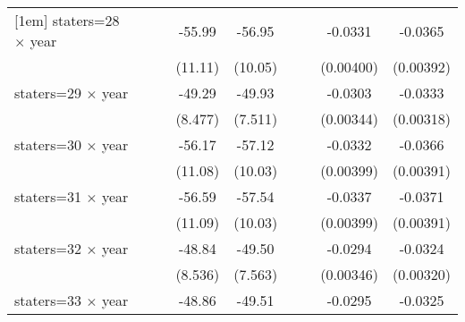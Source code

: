 {\begin{longtable}{l*{8}{c}}
[1em]
staters=28 $\times$ year&                     &                     &      -55.99\sym{***}&      -56.95\sym{***}&                     &                     &     -0.0331\sym{***}&     -0.0365\sym{***}\\
                    &                     &                     &     (11.11)         &     (10.05)         &                     &                     &   (0.00400)         &   (0.00392)         \\
[1em]
staters=29 $\times$ year&                     &                     &      -49.29\sym{***}&      -49.93\sym{***}&                     &                     &     -0.0303\sym{***}&     -0.0333\sym{***}\\
                    &                     &                     &     (8.477)         &     (7.511)         &                     &                     &   (0.00344)         &   (0.00318)         \\
[1em]
staters=30 $\times$ year&                     &                     &      -56.17\sym{***}&      -57.12\sym{***}&                     &                     &     -0.0332\sym{***}&     -0.0366\sym{***}\\
                    &                     &                     &     (11.08)         &     (10.03)         &                     &                     &   (0.00399)         &   (0.00391)         \\
[1em]
staters=31 $\times$ year&                     &                     &      -56.59\sym{***}&      -57.54\sym{***}&                     &                     &     -0.0337\sym{***}&     -0.0371\sym{***}\\
                    &                     &                     &     (11.09)         &     (10.03)         &                     &                     &   (0.00399)         &   (0.00391)         \\
[1em]
staters=32 $\times$ year&                     &                     &      -48.84\sym{***}&      -49.50\sym{***}&                     &                     &     -0.0294\sym{***}&     -0.0324\sym{***}\\
                    &                     &                     &     (8.536)         &     (7.563)         &                     &                     &   (0.00346)         &   (0.00320)         \\
[1em]
staters=33 $\times$ year&                     &                     &      -48.86\sym{***}&      -49.51\sym{***}&                     &                     &     -0.0295\sym{***}&     -0.0325\sym{***}\\

\end{longtable}}
